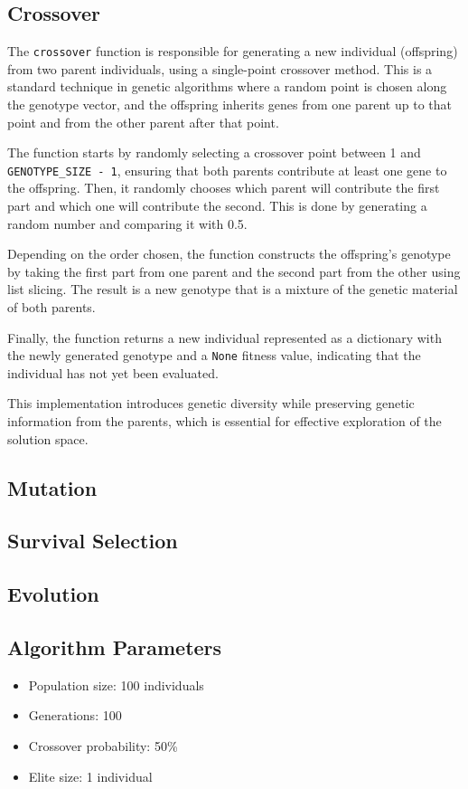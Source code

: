 \documentclass{article}
\begin{document}
\subsection{Crossover}
The \texttt{crossover} function is responsible for generating a new individual (offspring) from two parent individuals, using a single-point crossover method. This is a standard technique in genetic algorithms where a random point is chosen along the genotype vector, and the offspring inherits genes from one parent up to that point and from the other parent after that point.

The function starts by randomly selecting a crossover point between 1 and \texttt{GENOTYPE\_SIZE - 1}, ensuring that both parents contribute at least one gene to the offspring. Then, it randomly chooses which parent will contribute the first part and which one will contribute the second. This is done by generating a random number and comparing it with 0.5.

Depending on the order chosen, the function constructs the offspring's genotype by taking the first part from one parent and the second part from the other using list slicing. The result is a new genotype that is a mixture of the genetic material of both parents.

Finally, the function returns a new individual represented as a dictionary with the newly generated genotype and a \texttt{None} fitness value, indicating that the individual has not yet been evaluated.

This implementation introduces genetic diversity while preserving genetic information from the parents, which is essential for effective exploration of the solution space.

\subsection{Mutation}
\subsection{Survival Selection}
\subsection{Evolution}

\subsection{Algorithm Parameters}
\begin{itemize}
    \item Population size: 100 individuals
    \item Generations: 100
    \item Crossover probability: 50\%
    \item Elite size: 1 individual
\end{itemize}
\end{document}
